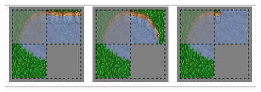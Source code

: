\begin{figure}
\begin{center}
\begin{tabular}{c c c}
		\includegraphics[scale=1]{Example/TheManaWorld/shorelinecorners/pattern3.eps} & \includegraphics[scale=1]{Example/TheManaWorld/shorelinecorners/pattern4.eps} & \includegraphics[scale=1]{Example/TheManaWorld/shorelinecorners/pattern5.eps} \\

\end{tabular}
\end{center}
\end{figure}
